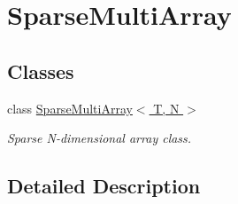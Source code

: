 \hypertarget{group___sparse_multi_array}{\section{Sparse\-Multi\-Array}
\label{group___sparse_multi_array}
}
\subsection*{Classes}
\begin{DoxyCompactItemize}
\item 
class \hyperlink{class_d_o_1_1_sparse_multi_array}{Sparse\-Multi\-Array$<$ T, N $>$}
\begin{DoxyCompactList}\small\item\em Sparse N-\/dimensional array class. \end{DoxyCompactList}\end{DoxyCompactItemize}


\subsection{Detailed Description}

